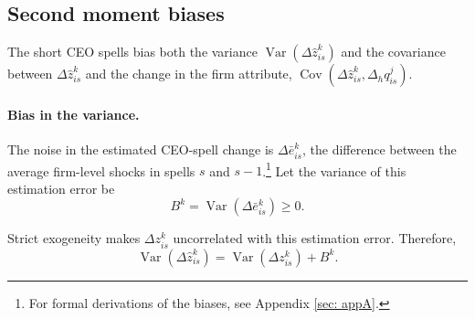 \documentclass[sigconf,nonacm]{acmart}
\begin{document}
\subsection{Second moment biases}\label{subsec:variance_bias}

The short CEO spells bias both the variance $\operatorname{Var}\!\left(
\Delta\widehat z_{is}^{k} \right)$ and the covariance between $\Delta\widehat z_{is}^{k}$ and the change in the firm attribute, $\operatorname{Cov}\!\left(\Delta\widehat z_{is}^{k},\Delta_h q_{is}^{j}\right)$.
\vspace{.2cm}

\paragraph{Bias in the variance.} The noise in the estimated CEO-spell change is $\Delta\bar e_{is}^{k}$, the difference between the average firm-level shocks in spells $s$ and $s-1$.\footnote{For formal derivations of the biases, see Appendix \ref{sec: appA}.} Let the variance of this estimation error be
\begin{equation}
B^{k}
=
\operatorname{Var}\!\left(
\Delta\bar e_{is}^{k}
\right)
\geq 0.
\label{eq:B_definition}
\end{equation}

Strict exogeneity makes $\Delta z_{is}^{k}$ uncorrelated with this estimation error. Therefore,
\begin{equation}
\operatorname{Var}\!\left(
\Delta\widehat z_{is}^{k}
\right)
=
\operatorname{Var}\!\left(
\Delta z_{is}^{k}
\right)
+
B^{k}.
\label{eq:variance_bias}
\end{equation}
\end{document}
